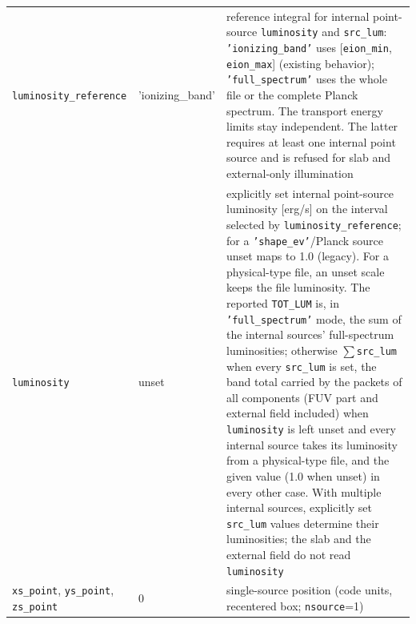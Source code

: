 \documentclass[english,a4paper]{my_memo}
\newcommand{\code}[1]{\texttt{#1}}
\begin{document}
{\begin{longtable}{llp{7.2cm}}
\code{luminosity\_reference} & 'ionizing\_band' & reference integral for internal point-source \code{luminosity} and \code{src\_lum}: \code{'ionizing\_band'} uses [\code{eion\_min}, \code{eion\_max}] (existing behavior); \code{'full\_spectrum'} uses the whole file or the complete Planck spectrum.  The transport energy limits stay independent.  The latter requires at least one internal point source and is refused for slab and external-only illumination \\
\code{luminosity} & unset & explicitly set internal point-source luminosity [erg/s] on the interval selected by \code{luminosity\_reference}; for a \code{'shape\_ev'}/Planck source unset maps to 1.0 (legacy).  For a physical-type file, an unset scale keeps the file luminosity.  The reported \code{TOT\_LUM} is, in \code{'full\_spectrum'} mode, the sum of the internal sources' full-spectrum luminosities; otherwise $\sum$\code{src\_lum} when every \code{src\_lum} is set, the band total carried by the packets of all components (FUV part and external field included) when \code{luminosity} is left unset and every internal source takes its luminosity from a physical-type file, and the given value (1.0 when unset) in every other case.  With multiple internal sources, explicitly set \code{src\_lum} values determine their luminosities; the slab and the external field do not read \code{luminosity} \\
\code{xs\_point}, \code{ys\_point}, \code{zs\_point} & 0 & single-source position (code units, recentered box; \code{nsource}=1) \\
\end{longtable}
}
\end{document}
